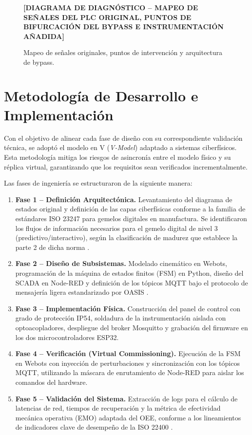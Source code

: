 \begin{figure}[htbp]
\centering
\textbf{[DIAGRAMA DE DIAGNÓSTICO – MAPEO DE SEÑALES DEL PLC ORIGINAL, PUNTOS DE BIFURCACIÓN DEL BYPASS E INSTRUMENTACIÓN AÑADIDA]}
\caption{Mapeo de señales originales, puntos de intervención y arquitectura de bypass.}
\label{fig:diag_diag}
\end{figure}

\section{Metodología de Desarrollo e Implementación}

Con el objetivo de alinear cada fase de diseño con su correspondiente validación técnica, se adoptó el modelo en V (\textit{V-Model}) adaptado a sistemas ciberfísicos. Esta metodología mitiga los riesgos de asincronía entre el modelo físico y su réplica virtual, garantizando que los requisitos sean verificados incrementalmente.

Las fases de ingeniería se estructuraron de la siguiente manera:

\begin{enumerate}
    \item \textbf{Fase 1 – Definición Arquitectónica.} Levantamiento del diagrama de estados original y definición de las capas ciberfísicas conforme a la familia de estándares ISO 23247 para gemelos digitales en manufactura. Se identificaron los flujos de información necesarios para el gemelo digital de nivel 3 (predictivo/interactivo), según la clasificación de madurez que establece la parte 2 de dicha norma \cite{iso23247-2}.
    
    \item \textbf{Fase 2 – Diseño de Subsistemas.} Modelado cinemático en Webots, programación de la máquina de estados finitos (FSM) en Python, diseño del SCADA en Node-RED y definición de los tópicos MQTT bajo el protocolo de mensajería ligera estandarizado por OASIS \cite{oasis2014mqtt}.
    
    \item \textbf{Fase 3 – Implementación Física.} Construcción del panel de control con grado de protección IP54, soldadura de la instrumentación aislada con optoacopladores, despliegue del broker Mosquitto y grabación del firmware en los dos microcontroladores ESP32.
    
    \item \textbf{Fase 4 – Verificación (Virtual Commissioning).} Ejecución de la FSM en Webots con inyección de perturbaciones y sincronización con los tópicos MQTT, utilizando la máscara de enrutamiento de Node-RED para aislar los comandos del hardware.
    
    \item \textbf{Fase 5 – Validación del Sistema.} Extracción de logs para el cálculo de latencias de red, tiempos de recuperación y la métrica de efectividad mecánica operativa (EMO) adaptada del OEE, conforme a los lineamientos de indicadores clave de desempeño de la ISO 22400 \cite{iso22400-2}.
\end{enumerate}

